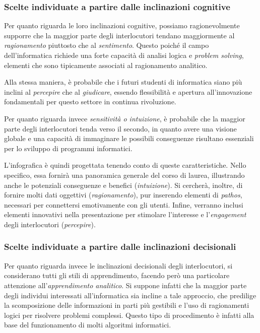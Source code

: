 \subsubsection{Scelte individuate a partire dalle inclinazioni cognitive}
Per quanto riguarda le loro inclinazioni cognitive, possiamo ragionevolmente supporre che la maggior parte degli interlocutori tendano maggiormente al \emph{ragionamento} piuttosto che al \emph{sentimento}. 
Questo poiché il campo dell'informatica richiede una forte capacità di analisi logica e \emph{problem solving}, elementi che sono tipicamente associati al ragionamento analitico. 

Alla stessa maniera, è probabile che i futuri studenti di informatica siano più inclini al \emph{percepire} che al \emph{giudicare}, essendo flessibilità e apertura all'innovazione fondamentali per questo settore 
in continua rivoluzione. 

Per quanto riguarda invece \emph{sensitività o intuizione}, è probabile che la maggior parte degli interlocutori tenda verso il secondo, in quanto avere una visione globale e una capacità di immaginare le possibili conseguenze 
risultano essenziali per lo sviluppo di programmi informatici.

\bigskip
\noindent L'infografica è quindi progettata tenendo conto di queste caratteristiche. Nello specifico, essa fornirà una panoramica generale del corso di laurea, illustrando anche le potenziali conseguenze e benefici (\emph{intuizione}). Si cercherà, inoltre, 
di fornire molti dati oggettivi (\emph{ragionamento}), pur inserendo elementi di \emph{pathos}, necessari per connettersi emotivamente con gli utenti. Infine, verranno inclusi elementi innovativi nella presentazione per stimolare l'interesse e 
l'\emph{engagement} degli interlocutori (\emph{percepire}).

\subsubsection{Scelte individuate a partire dalle inclinazioni decisionali}
Per quanto riguarda invece le inclinazioni decisionali degli interlocutori, si considerano tutti gli stili di apprendimento, facendo però una particolare attenzione all'\emph{apprendimento analitico}. Si suppone infatti che la 
maggior parte degli individui interessati all'informatica sia incline a tale approccio, che predilige la scomposizione delle informazioni in parti più gestibili e l'uso di ragionamenti logici per risolvere problemi complessi. Questo tipo di
procedimento è infatti alla base del funzionamento di molti algoritmi informatici.

